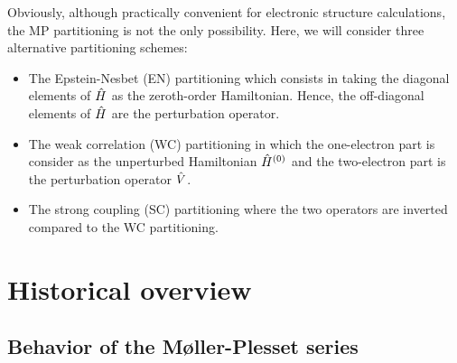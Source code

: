 \documentclass[11pt,a4paper]{article}
\newcommand{\hH}{\Hat{H}}
\newcommand{\hV}{\Hat{V}}
\begin{document}
Obviously, although practically convenient for electronic structure calculations, the MP partitioning is not the only possibility. 
Here, we will consider three alternative partitioning schemes:
\begin{itemize}
	\item The Epstein-Nesbet (EN) partitioning which consists in taking the diagonal elements of $\hH$ as the zeroth-order Hamiltonian. 
	Hence, the off-diagonal elements of $\hH$ are the perturbation operator.
	\item The weak correlation (WC) partitioning in which the one-electron part is consider as the unperturbed Hamiltonian $\hH^{(0)}$ and the two-electron part is the perturbation operator $\hV$.
	\item The strong coupling (SC) partitioning where the two operators are inverted compared to the WC partitioning.
\end{itemize}

\section{Historical overview}

\subsection{Behavior of the M{\o}ller-Plesset series}
\end{document}
